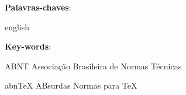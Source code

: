\begin{epigrafe}
    \vspace*{\fill}
	\begin{flushright}
        \EpigrafeTexto
	\end{flushright}
\end{epigrafe}


\setlength{\absparsep}{18pt} %
\begin{resumo}
    \ResumoTexto
    \vspace{\onelineskip}
    \noindent 
    \textbf{Palavras-chaves}: \PalavraschaveTexto
\end{resumo}

\begin{resumo}[ABSTRACT]
 \begin{otherlanguage*}{english}
   \AbstractTexto
   \vspace{\onelineskip}
 
   \noindent 
   \textbf{Key-words}: \KeywordsTexto
 \end{otherlanguage*}
\end{resumo}

%  
% 
%   

\listoffigures*
\cleardoublepage

\listoftables*

\listarsiglas
\begin{siglas}
  \item[ABNT] Associação Brasileira de Normas Técnicas
  \item[abnTeX] ABsurdas Normas para TeX
\end{siglas}

